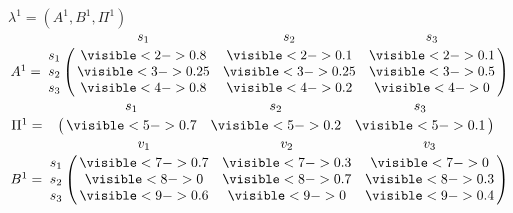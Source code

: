 \begin{frame}
\begin{columns}[T]
    $\lambda^{1}=(A^{1},B^{1},\Pi^{1})$\\\vspace*{1em}%
    $A^{1} = \bordermatrix{~ & s_1 &
      s_2 & s_3 \cr s_1 &     \visible<2->{0.8} & \visible<2->{0.1} & \visible<2->{0.1} \cr s_2 &
      \visible<3->{0.25} & \visible<3->{0.25} & \visible<3->{0.5}
      \cr s_3 & \visible<4->{0.8} & \visible<4->{0.2} &
      \visible<4->{0} \cr}$\\\vspace*{1em}%
    $\Pi^{1} = \bordermatrix{ ~ & s_1 & s_2 & s_3 \cr ~ 
      & \visible<5->{0.7} & \visible<5->{0.2} & \visible<5->{0.1} \cr}$\\\vspace*{1em}%
    $B^{1} = \bordermatrix{~ & v_1 &
      v_2 & v_3 \cr s_1 & \visible<7->{0.7} & \visible<7->{0.3} & \visible<7->{0} \cr s_2 &
          \visible<8->{0} & \visible<8->{0.7} & \visible<8->{0.3}
          \cr s_3 & \visible<9->{0.6} & \visible<9->{0} &
          \visible<9->{0.4} \cr}$
  \end{columns}%
\end{frame}%

